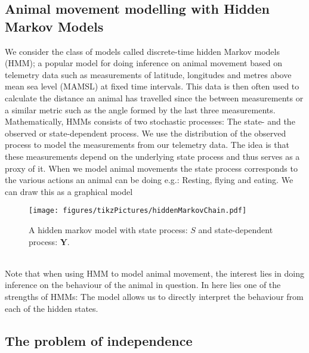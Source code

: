 
\subsection*{Animal movement modelling with Hidden Markov Models}
We consider the class of models called discrete-time hidden Markov models (HMM); a popular model for doing inference on animal movement based on telemetry data such as measurements of latitude, longitudes and metres above mean sea level (MAMSL) at fixed time intervals. This data is then often used to calculate the distance an animal has travelled since the between measurements or a similar metric such as the angle formed by the last three measurements.\\ Mathematically, HMMs consists of two stochastic processes: The state- and the observed or state-dependent process. We use the distribution of the observed process to model the measurements from our telemetry data. The idea is that these measurements depend on the underlying state process and thus serves as a proxy of it. When we model animal movements the state process corresponds to the various actions an animal can be doing e.g.: Resting, flying and eating. We can draw this as a graphical model
\begin{figure}[h]
    \centering
    \texttt{[image: figures/tikzPictures/hiddenMarkovChain.pdf]}
    \caption{A hidden markov model with state process: $S$ and state-dependent process: $\mathbf{Y}$.}
\end{figure}\\
Note that when using HMM to model animal movement, the interest lies in doing inference on the behaviour of the animal in question. In here lies one of the strengths of HMMs: The model allows us to directly interpret the behaviour from each of the hidden states.
\subsection*{The problem of independence}